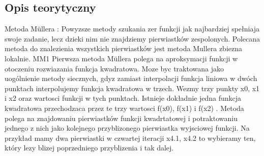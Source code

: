 \documentclass[11pt, oneside]{article}   	%
\begin{document}
\subsection{Opis teorytyczny}

Metoda Müllera : Powyzsze metody szukania zer funkcji jak najbardziej
spełniaja swoje zadanie, lecz dzieki nim nie znajdziemy pierwiastków zespolonych.
Polecana metoda do znalezienia wszystkich pierwiastków jest metoda
Mullera zbiezna lokalnie.
MM1 Pierwsza metoda Müllera polega na aproksymacji funkcji w otoczeniu
rozwiazania funkcja kwadratowa. Moze byc traktowana jako uogólnienie
metody siecznych, gdyz zamiast interpolacji funkcja liniowa w dwóch punktach
interpolujemy funkcja kwadratowa w trzech.
Wezmy trzy punkty x0, x1 i x2 oraz wartosci funkcji w tych punktach. Istnieje
dokładnie jedna funkcja kwadratowa przechodzaca przez te trzy wartosci
f(x0), f(x1) i f(x2) . Metoda polega na znajdowaniu pierwiastków funkcji
kwadrtatowej i potraktowaniu jednego z nich jako kolejnego przyblizonego
pierwiastka wyjsciowej funkcji. Na przykład mamy dwa pierwiastki w czwartej
iteracji x4.1, x4.2 to wybieramy ten, który lezy blizej poprzedniego przyblizenia
i tak dalej.
\end{document}
